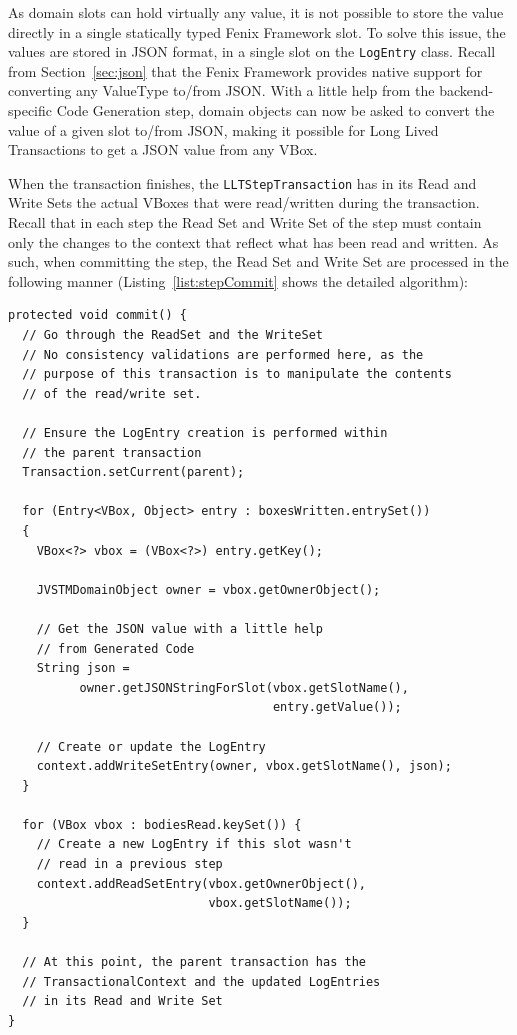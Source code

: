 As domain slots can hold virtually any value, it is not possible to
store the value directly in a single statically typed Fenix Framework
slot. To solve this issue, the values are stored in JSON format, in a
single slot on the \texttt{LogEntry} class. Recall from
Section~\ref{sec:json} that the Fenix Framework provides native
support for converting any ValueType to/from JSON. With a little help
from the backend-specific Code Generation step, domain objects can now
be asked to convert the value of a given slot to/from JSON, making it
possible for Long Lived Transactions to get a JSON value from any
VBox.

When the transaction finishes, the \texttt{LLTStepTransaction} has in
its Read and Write Sets the actual VBoxes that were read/written
during the transaction. Recall that in each step the Read Set and
Write Set of the step must contain only the changes to the context
that reflect what has been read and written. As such, when committing
the step, the Read Set and Write Set are processed in the following
manner (Listing~\ref{list:stepCommit} shows the detailed algorithm):

\begin{lstlisting}[caption={Algorithm for committing a Long Lived
    Transaction's step}, label={list:stepCommit}, float]
protected void commit() {
  // Go through the ReadSet and the WriteSet
  // No consistency validations are performed here, as the 
  // purpose of this transaction is to manipulate the contents
  // of the read/write set.

  // Ensure the LogEntry creation is performed within
  // the parent transaction
  Transaction.setCurrent(parent);

  for (Entry<VBox, Object> entry : boxesWritten.entrySet()) 
  {
    VBox<?> vbox = (VBox<?>) entry.getKey();

    JVSTMDomainObject owner = vbox.getOwnerObject();

    // Get the JSON value with a little help
    // from Generated Code
    String json = 
          owner.getJSONStringForSlot(vbox.getSlotName(), 
                                     entry.getValue());

    // Create or update the LogEntry
    context.addWriteSetEntry(owner, vbox.getSlotName(), json);
  }

  for (VBox vbox : bodiesRead.keySet()) {
    // Create a new LogEntry if this slot wasn't
    // read in a previous step
    context.addReadSetEntry(vbox.getOwnerObject(), 
                            vbox.getSlotName());
  }

  // At this point, the parent transaction has the 
  // TransactionalContext and the updated LogEntries
  // in its Read and Write Set
}
\end{lstlisting}

